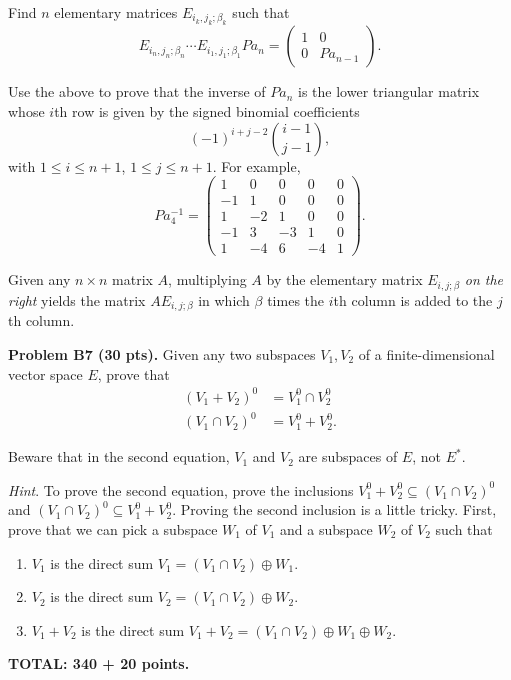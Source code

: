 \documentclass[12pt]{article}
\begin{document}
Find $n$ elementary matrices $E_{i_k, j_k; \beta_k}$ such that
\[
E_{i_n, j_n; \beta_n} \cdots E_{i_1, j_1; \beta_1} Pa_n = 
\begin{pmatrix}
1 & 0 \\
0 & Pa_{n - 1}
\end{pmatrix}.
\]

Use the above to prove that the inverse of $Pa_n$ is the lower
triangular matrix whose $i$th row is given by the signed binomial
coefficients
\[
(-1)^{i + j - 2}\binom{i-1}{j-1},
\]
with $1 \leq i \leq n + 1$, $1 \leq j \leq n + 1$.
For example,
\[
Pa_4^{-1} = 
\begin{pmatrix}
1 & 0 & 0 & 0 & 0\\
-1 & 1 & 0 & 0 & 0 \\
1 & -2 & 1 & 0 & 0 \\
-1 & 3 & -3 & 1 & 0 \\
1 & -4 & 6 & -4 & 1
\end{pmatrix}.
\]

\hint
Given any $n\times n$ matrix $A$, 
multiplying $A$ by the elementary matrix
$E_{i, j; \beta}$ {\it on the right\/} yields
the matrix $AE_{i, j; \beta}$ in which $\beta$ times the  $i$th column is
added to the $j$th column.



\vspace {0.25cm}\noindent
{\bf Problem B7 (30 pts).}
Given any two subspaces $V_1, V_2$ of a finite-dimensional
vector space $E$,
prove that
\begin{align*}
(V_1 + V_2)^{0} & = V_1^0\cap V_2^0 \\
(V_1 \cap V_2)^{0}& = V_1^0 +  V_2^0.
\end{align*}

Beware that in the second equation, $V_1$ and $V_2$ are subspaces of
$E$, not $E^*$.

\medskip\noindent
{\it Hint\/}. To prove the second equation, prove the inclusions
$V_1^0 +  V_2^0 \subseteq (V_1 \cap V_2)^{0}$ and
$(V_1 \cap V_2)^{0} \subseteq  V_1^0 +  V_2^0$.
Proving the second inclusion is a little tricky. First, prove that
we can pick a subspace $W_1$ of $V_1$ and a
subspace $W_2$ of $V_2$ such that 
\begin{enumerate}
\item
$V_1$ is the direct sum
$V_1 = (V_1\cap V_2) \oplus W_1$.
\item 
$V_2$ is the direct sum
$V_2 = (V_1\cap V_2) \oplus W_2$.
\item
$V_1 + V_2$ is the direct sum
$V_1 + V_2 = (V_1 \cap V_2) \oplus W_1\oplus W_2$.
\end{enumerate}



\vspace{0.5cm}\noindent
{\bf TOTAL: 340 + 20  points.}
\end{document}
